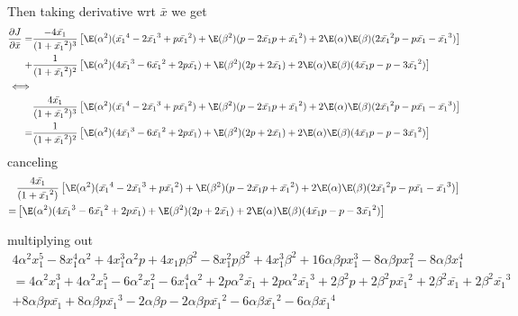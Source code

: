 Then taking derivative wrt $\bar{x}$ we get
\begin{align*}
	\frac{\partial J}{\partial \bar{x}} = 
	&\frac{-4 \bar{x_1}}{(1 + \bar{x_1}^2)^3} 
	\left[ \E(\alpha^2)(\bar{x_1}^4 - 2\bar{x_1}^3 + p \bar{x_1}^2)
	+ \E(\beta^2) ( p - 2 \bar{x_1} p + \bar{x_1}^2) + 2 \E(\alpha)\E(\beta)(2 \bar{x_1}^2 p - p \bar{x_1} - \bar{x_1}^3) \right] \\
	+ &\frac{1}{(1 + \bar{x_1}^2)^2} 
	\left[ \E(\alpha^2)(4 \bar{x_1}^3 - 6\bar{x_1}^2 + 2 p \bar{x_1})
	+ \E(\beta^2) ( 2 p + 2\bar{x_1}) + 2 \E(\alpha)\E(\beta)(4 \bar{x_1} p - p - 3 \bar{x_1}^2) \right] \\
	\iff& \\
		&\frac{4 \bar{x_1}}{(1 + \bar{x_1}^2)^3} 
	\left[ \E(\alpha^2)(\bar{x_1}^4 - 2\bar{x_1}^3 + p \bar{x_1}^2)
	+ \E(\beta^2) ( p - 2 \bar{x_1} p + \bar{x_1}^2) + 2 \E(\alpha)\E(\beta)(2 \bar{x_1}^2 p - p \bar{x_1} - \bar{x_1}^3) \right] \\
	= &\frac{1}{(1 + \bar{x_1}^2)^2} 
	\left[ \E(\alpha^2)(4 \bar{x_1}^3 - 6\bar{x_1}^2 + 2 p \bar{x_1})
	+ \E(\beta^2) ( 2 p + 2\bar{x_1}) + 2 \E(\alpha)\E(\beta)(4 \bar{x_1} p - p - 3 \bar{x_1}^2) \right]
\end{align*} 
canceling
\begin{align*}
		&\frac{4 \bar{x_1}}{(1 + \bar{x_1}^2)} 
	\left[ \E(\alpha^2)(\bar{x_1}^4 - 2\bar{x_1}^3 + p \bar{x_1}^2)
	+ \E(\beta^2) ( p - 2 \bar{x_1} p + \bar{x_1}^2) + 2 \E(\alpha)\E(\beta)(2 \bar{x_1}^2 p - p \bar{x_1} - \bar{x_1}^3) \right] \\
	= &\left[ \E(\alpha^2)(4 \bar{x_1}^3 - 6\bar{x_1}^2 + 2 p \bar{x_1})
	+ \E(\beta^2) ( 2 p + 2\bar{x_1}) + 2 \E(\alpha)\E(\beta)(4 \bar{x_1} p - p - 3 \bar{x_1}^2) \right]
\end{align*} 

multiplying out
\begin{align*}
	  4 \alpha^2 x_1^5 - 8 x_1^4 \alpha^2 + 4 x_1^3 \alpha^2 p + 4x_1 p \beta^2 - 8 x_1^2 p \beta^2 + 4 x_1^3 \beta^2 + 16 \alpha \beta p x_1^3 - 8 \alpha \beta p x_1^2 - 8 \alpha \beta x_1^4 \\
	  = 4 \alpha^2 x_1^3 + 4 \alpha^2 x_1^5 - 6 \alpha^2 x_1^2 - 6 x_1^4 \alpha^2 + 2p \alpha^2 \bar{x_1} + 2p \alpha^2 \bar{x_1}^3
	  + 2 \beta^2 p + 2 \beta^2 p \bar{x_1}^2 + 2 \beta^2 \bar{x_1} + 2 \beta^2 \bar{x_1}^3 \\
	  + 8 \alpha \beta p \bar{x_1} + 8 \alpha \beta p \bar{x_1}^3 - 2 \alpha \beta p - 2 \alpha \beta p \bar{x_1}^2 - 6 \alpha \beta \bar{x_1}^2 - 6 \alpha \beta \bar{x_1}^4
\end{align*} 

